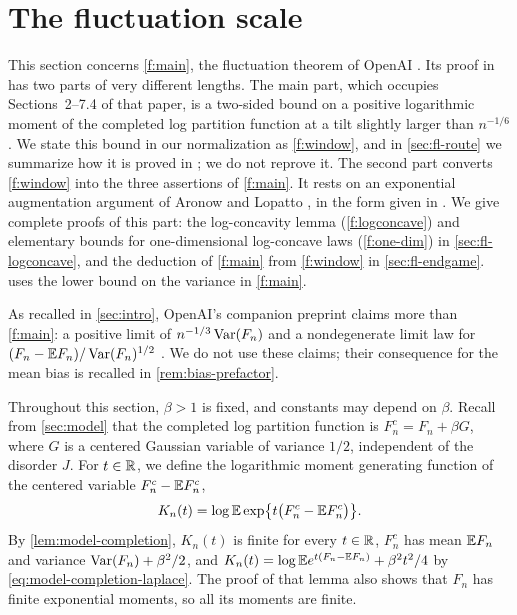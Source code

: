 \chapter{The fluctuation scale}\label{sec:fluct}

This section concerns \cref{f:main}, the fluctuation theorem of OpenAI \cite[Theorem~1.1]{oai-fluctuations}. Its proof in \cite{oai-fluctuations} has two parts of very different lengths. The main part, which occupies Sections~2--7.4 of that paper, is a two-sided bound on a positive logarithmic moment of the completed log partition function at a tilt slightly larger than $n^{-1/6}$. We state this bound in our normalization as \cref{f:window}, and in \cref{sec:fl-route} we summarize how it is proved in \cite{oai-fluctuations}; we do not reprove it. The second part converts \cref{f:window} into the three assertions of \cref{f:main}. It rests on an exponential augmentation argument of Aronow and Lopatto \cite[Proposition~5.1]{quantitative-parisi}, in the form given in \cite[Lemmas~7.6 and~7.7 and Section~7.6]{oai-fluctuations}. We give complete proofs of this part: the log-concavity lemma (\cref{f:logconcave}) and elementary bounds for one-dimensional log-concave laws (\cref{f:one-dim}) in \cref{sec:fl-logconcave}, and the deduction of \cref{f:main} from \cref{f:window} in \cref{sec:fl-endgame}.  uses the lower bound on the variance in \cref{f:main}.

As recalled in \cref{sec:intro}, OpenAI's companion preprint \cite{oai-limiting-law} claims more than \cref{f:main}: a positive limit of $n^{-1/3}\operatorname{Var}(F_n)$ and a nondegenerate limit law for $(F_n-\mathbb E F_n)/\operatorname{Var}(F_n)^{1/2}$ \cite[Theorems~1.1 and~1.2]{oai-limiting-law}. We do not use these claims; their consequence for the mean bias is recalled in \cref{rem:bias-prefactor}.

Throughout this section, $\beta>1$ is fixed, and constants may depend on $\beta$. Recall from \cref{sec:model} that the completed log partition function is $F_n^c=F_n+\beta G$, where $G$ is a centered Gaussian variable of variance $1/2$, independent of the disorder $J$. For $t\in\mathbb R$, we define the logarithmic moment generating function of the centered variable $F_n^c-\mathbb E F_n^c$,
\begin{equation}\label{eq:fl-transform}
 K_n(t)=\log\mathbb E\exp\bigl\{t\bigl(F_n^c-\mathbb E F_n^c\bigr)\bigr\}.
\end{equation}
By \cref{lem:model-completion}, $K_n(t)$ is finite for every $t\in\mathbb R$, $F_n^c$ has mean $\mathbb E F_n$ and variance $\operatorname{Var}(F_n)+\beta^2/2$, and $K_n(t)=\log\mathbb E e^{t(F_n-\mathbb E F_n)}+\beta^2t^2/4$ by \eqref{eq:model-completion-laplace}. The proof of that lemma also shows that $F_n$ has finite exponential moments, so all its moments are finite.


